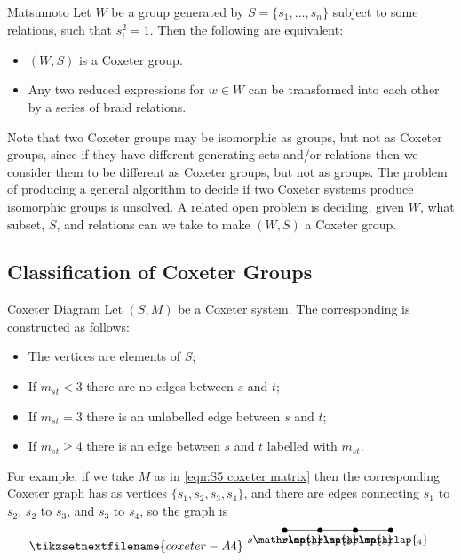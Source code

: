 \documentclass[fleqn]{NotesClass}
\begin{document}
    \begin{thm}{Matsumoto}{}
        Let \(W\) be a group generated by \(S = \{s_1, \dotsc, s_n\}\) subject to some relations, such that \(s_i^2 = 1\).
        Then the following are equivalent:
        \begin{itemize}
            \item \((W, S)\) is a Coxeter group.
            \item Any two reduced expressions for \(w \in W\) can be transformed into each other by a series of braid relations.
        \end{itemize}
    \end{thm}
    
    Note that two Coxeter groups may be isomorphic as groups, but not as Coxeter groups, since if they have different generating sets and/or relations then we consider them to be different as Coxeter groups, but not as groups.
    The problem of producing a general algorithm to decide if two Coxeter systems produce isomorphic groups is unsolved.
    A related open problem is deciding, given \(W\), what subset, \(S\), and relations can we take to make \((W, S)\) a Coxeter group.
    
    \subsection{Classification of Coxeter Groups}
    \begin{dfn}{Coxeter Diagram}{}
        Let \((S, M)\) be a Coxeter system.
        The corresponding  is constructed as follows:
        \begin{itemize}
            \item The vertices are elements of \(S\);
            \item If \(m_{st} < 3\) there are no edges between \(s\) and \(t\);
            \item If \(m_{st} = 3\) there is an unlabelled edge between \(s\) and \(t\);
            \item If \(m_{st} \ge 4\) there is an edge between \(s\) and \(t\) labelled with \(m_{st}\).
        \end{itemize}
    \end{dfn}
    
    For example, if we take \(M\) as in \cref{eqn:S5 coxeter matrix} then the corresponding Coxeter graph has as vertices \(\{s_1, s_2, s_3, s_4\}\), and there are edges connecting \(s_1\) to \(s_2\), \(s_2\) to \(s_3\), and \(s_3\) to \(s_4\), so the graph is
    \begin{equation}
        \tikzsetnextfilename{coxeter-A4}
        \begin{tikzpicture}[font=\small]
            \fill (0, 0) circle [radius=0.075cm] node [below] {\(s\mathrlap{_1}\)};
            \fill (1, 0) circle [radius=0.075cm] node [below] {\(s\mathrlap{_2}\)};
            \fill (2, 0) circle [radius=0.075cm] node [below] {\(s\mathrlap{_3}\)};
            \fill (3, 0) circle [radius=0.075cm] node [below] {\(s\mathrlap{_4}\)};
            \draw (0, 0) -- (3, 0);
        \end{tikzpicture}
    \end{equation}
    
\end{document}
